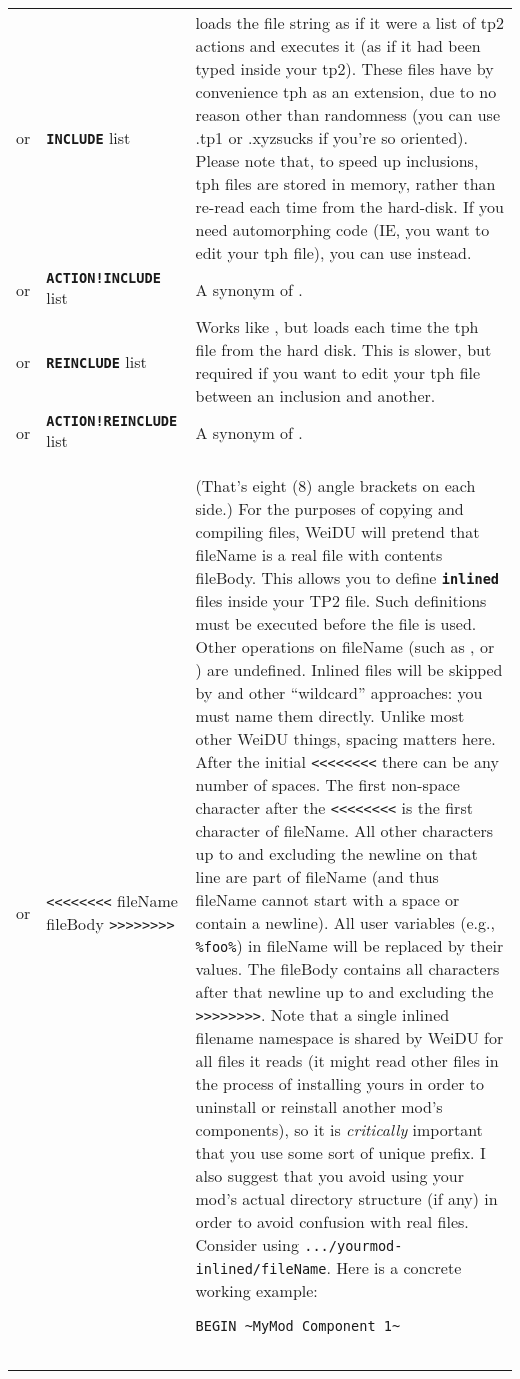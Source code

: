 \documentclass{article}
\def\ttref#1{\ahrefloc{#1}{\tt #1}}
\def\DEFINE#1{{\tt \bf #1}\label{#1}\index{#1}}
\def\t#1{{\tt #1}}
\def\Slist{{\color{red} list }}
\begin{document}
\begin{tabular}{cp{10in}|p{10in}}
or & \DEFINE{INCLUDE} \t{\ttref{String}} \Slist &
    loads the file string as if it were a list of tp2 actions and executes it (as if
		it had been typed inside your tp2).
    These files have by convenience tph as an extension, due to no reason other than
    randomness (you can use .tp1 or .xyzsucks if you're so oriented).
		Please note that, to speed up inclusions, tph files are stored in memory,
	  rather than re-read each time from the hard-disk. If you need automorphing code
		(IE, you want to edit your tph file), you can use \ttref{REINCLUDE} instead. \\
or & \DEFINE{ACTION!INCLUDE} \t{\ttref{String}} \Slist &
    A synonym of \ttref{INCLUDE}.
\\
or & \DEFINE{REINCLUDE} \t{\ttref{String}} \Slist &
    Works like \ttref{INCLUDE}, but loads each time the tph file from the hard disk.
    This is slower, but required if you want to edit your tph file between an
    inclusion and another.
    \\
or & \DEFINE{ACTION!REINCLUDE} \t{\ttref{String}} \Slist &
    A synonym of \ttref{INCLUDE}.
    \\
  or & \t{<<<<<<<<} fileName fileBody \t{>>>>>>>>} &
    (That's eight (8) angle brackets on each side.)
    For the purposes of copying and compiling files, WeiDU will pretend
    that fileName is a real file with contents fileBody. This allows you to
    define \DEFINE{inlined} files inside your TP2 file. Such definitions
    must be executed before the \ttref{inlined} file is used. Other operations
    on fileName (such as \ttref{FILE!EXISTS}, \ttref{FILE!MD5} or
    \ttref{FILE!SIZE}) are undefined. Inlined files will be skipped by
    \ttref{COPY!EXISTING!REGEXP} and other ``wildcard'' approaches: you
    must name them directly. Unlike most other WeiDU things,
    spacing matters here. After the initial \t{<<<<<<<<} there can be
    any number of spaces. The first non-space character after the
    \t{<<<<<<<<} is the first character of fileName. All other
    characters up to and excluding the newline on that line are part of
    fileName (and thus fileName cannot start with a space or contain a
    newline). All user variables (e.g., \t{\%foo\%}) in fileName will be
    replaced by their values.
    The fileBody contains all characters after that newline up to
    and excluding the \t{>>>>>>>>}. Note that a single inlined filename
    namespace is shared by WeiDU for all \ttref{TP2} files it reads (it
    might read other \ttref{TP2} files in the process of installing yours
    in order to uninstall or reinstall another mod's components), so it is
    \emph{critically} important that you use some sort of unique prefix.
    I also suggest that you avoid using your mod's actual directory
    structure (if any) in order to avoid confusion with real files.
    Consider using \t{.../yourmod-inlined/fileName}.  Here is a concrete
    working example:
\begin{verbatim}
BEGIN ~MyMod Component 1~


\end{verbatim}
\end{tabular}
\end{document}
